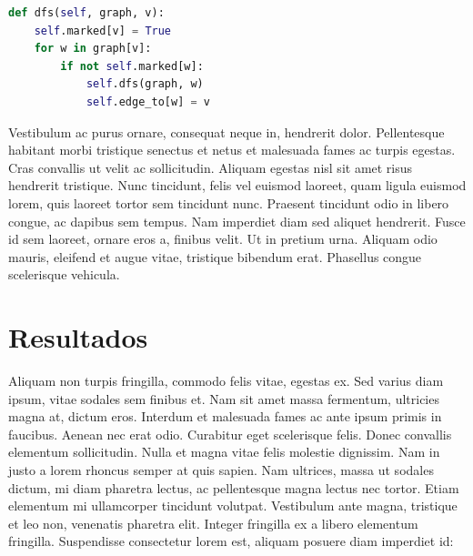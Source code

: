 \documentclass[12pt]{article}
\begin{document}
\begin{lstlisting}[language=Python]
def dfs(self, graph, v):
    self.marked[v] = True
    for w in graph[v]:  
        if not self.marked[w]:
            self.dfs(graph, w)
            self.edge_to[w] = v
\end{lstlisting}

Vestibulum ac purus ornare, consequat neque in, hendrerit dolor. Pellentesque habitant morbi tristique senectus et netus et malesuada fames ac turpis egestas. Cras convallis ut velit ac sollicitudin. Aliquam egestas nisl sit amet risus hendrerit tristique. Nunc tincidunt, felis vel euismod laoreet, quam ligula euismod lorem, quis laoreet tortor sem tincidunt nunc. Praesent tincidunt odio in libero congue, ac dapibus sem tempus. Nam imperdiet diam sed aliquet hendrerit. Fusce id sem laoreet, ornare eros a, finibus velit. Ut in pretium urna. Aliquam odio mauris, eleifend et augue vitae, tristique bibendum erat. Phasellus congue scelerisque vehicula.



\section{Resultados}

Aliquam non turpis fringilla, commodo felis vitae, egestas ex. Sed varius diam ipsum, vitae sodales sem finibus et. Nam sit amet massa fermentum, ultricies magna at, dictum eros. Interdum et malesuada fames ac ante ipsum primis in faucibus. Aenean nec erat odio. Curabitur eget scelerisque felis. Donec convallis elementum sollicitudin. Nulla et magna vitae felis molestie dignissim. Nam in justo a lorem rhoncus semper at quis sapien. Nam ultrices, massa ut sodales dictum, mi diam pharetra lectus, ac pellentesque magna lectus nec tortor. Etiam elementum mi ullamcorper tincidunt volutpat. Vestibulum ante magna, tristique et leo non, venenatis pharetra elit. Integer fringilla ex a libero elementum fringilla. Suspendisse consectetur lorem est, aliquam posuere diam imperdiet id:
\end{document}
